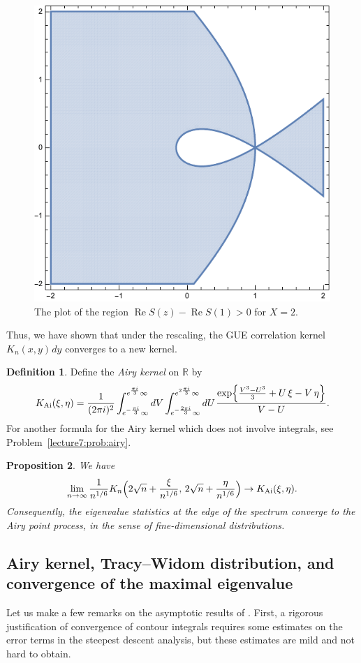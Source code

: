 \documentclass[letterpaper,11pt,oneside,reqno]{book}
\numberwithin{equation}{chapter}  %
\newcommand{\ssp}{\hspace{1pt}}
\newtheorem{proposition}{Proposition}[chapter]  %
\theoremstyle{definition}
\newtheorem{definition}[proposition]{Definition}
\begin{document}
\begin{figure}[htpb]
	\centering
	\includegraphics[height=.3\textwidth]{pictures/ReS_edge.pdf}
	\caption{The plot of the region $\operatorname{Re}S(z)-\operatorname{Re}S(1)>0$ for $X=2$.}
	\label{lecture7:fig:ReS_edge}
\end{figure}

Thus, we have shown that under the rescaling, the GUE correlation kernel
$K_n(x,y)\ssp dy$ converges to a new kernel.
\begin{definition}
	\label{lecture7:def:Airy_kernel}
	Define the \emph{Airy kernel} on $\mathbb{R}$ by
	\begin{equation*}
		K_{\mathrm{Ai}}(\xi,\eta)=\frac{1}{(2\pi i)^2}
		\int_{e^{-\frac{\pi i}{3}}\infty}^{e^{\frac{\pi i}{3}}\infty}dV
		\int_{e^{-\frac{2\pi i}{3}}\infty}^{e^{2\frac{\pi i}{3}}\infty}dU
		\ssp
		\frac{\exp\Bigl\{\frac{V^3-U^3}{3}+U\,\xi-V\,\eta\Bigr\}}{V-U}.
	\end{equation*}
	For another formula for the Airy kernel
	which does not involve integrals,
	see
	Problem~\ref{lecture7:prob:airy}.
\end{definition}

\begin{proposition}
	\label{lecture7:prop:edge}
	We have
	\begin{equation*}
		\lim_{n\to\infty}
		\frac{1}{n^{1/6}}K_n\Bigl(2\sqrt{n}+\frac{\xi}{n^{1/6}},\,2\sqrt{n}+\frac{\eta}{n^{1/6}}\Bigr)
		\to
		K_{\mathrm{Ai}}(\xi,\eta).
	\end{equation*}
	Consequently, the eigenvalue statistics at the edge of the spectrum converge to the Airy point process, in the sense of fine-dimensional distributions.
\end{proposition}

\subsection{Airy kernel, Tracy--Widom distribution, and convergence of the maximal
eigenvalue}

Let us make a few remarks on the asymptotic results of
.
First,
a rigorous justification of convergence
of contour integrals requires some estimates on the error terms
in the steepest descent analysis, but these
estimates are mild and not hard to obtain.
\end{document}
